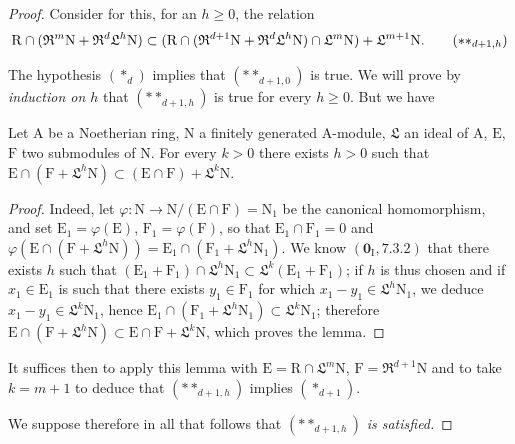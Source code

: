 \begin{proof}
Consider for this, for an $h\geqslant 0$, the relation
\begin{equation}
  \mathrm{R}\cap(\mathfrak{R}^m\mathrm{N}+\mathfrak{R}^d\mathfrak{L}^h\mathrm{N})\subset(\mathrm{R}\cap(\mathfrak{R}^{d+1}\mathrm{N}+\mathfrak{R}^d\mathfrak{L}^h\mathrm{N})\cap\mathfrak{L}^m\mathrm{N})+\mathfrak{L}^{m+1}\mathrm{N}.
  \tag{$**_{d+1,h}$}
\end{equation}

The hypothesis $(*_d)$ implies that $(**_{d+1,0})$ is true. We will prove by \emph{induction on $h$} that $(**_{d+1,h})$ is true for every $h\geqslant 0$. But we have

\begin{lemma}[19.7.1.7]
\label{IV.19.7.1.7}
Let $\mathrm{A}$ be a Noetherian ring, $\mathrm{N}$ a finitely generated $\mathrm{A}$-module, $\mathfrak{L}$ an ideal of $\mathrm{A}$, $\mathrm{E}$, $\mathrm{F}$ two submodules of $\mathrm{N}$. For every $k>0$ there exists $h>0$ such that $\mathrm{E}\cap(\mathrm{F}+\mathfrak{L}^h\mathrm{N})\subset(\mathrm{E}\cap\mathrm{F})+\mathfrak{L}^k\mathrm{N}$.
\end{lemma}

\begin{proof}
Indeed, let $\varphi:\mathrm{N}\to\mathrm{N}/(\mathrm{E}\cap\mathrm{F})=\mathrm{N}_1$ be the canonical homomorphism, and set $\mathrm{E}_1=\varphi(\mathrm{E})$, $\mathrm{F}_1=\varphi(\mathrm{F})$, so that $\mathrm{E}_1\cap\mathrm{F}_1=0$ and $\varphi(\mathrm{E}\cap(\mathrm{F}+\mathfrak{L}^h\mathrm{N}))=\mathrm{E}_1\cap(\mathrm{F}_1+\mathfrak{L}^h\mathrm{N}_1)$.
We know $(\mathbf{0}_\mathrm{I},7.3.2)$ that there exists $h$ such that $(\mathrm{E}_1+\mathrm{F}_1)\cap\mathfrak{L}^h\mathrm{N}_1\subset\mathfrak{L}^k(\mathrm{E}_1+\mathrm{F}_1)$; if $h$ is thus chosen and if $x_1\in\mathrm{E}_1$ is such that there exists $y_1\in\mathrm{F}_1$ for which $x_1-y_1\in\mathfrak{L}^h\mathrm{N}_1$, we deduce $x_1-y_1\in\mathfrak{L}^k\mathrm{N}_1$, hence $\mathrm{E}_1\cap(\mathrm{F}_1+\mathfrak{L}^h\mathrm{N}_1)\subset\mathfrak{L}^k\mathrm{N}_1$; therefore $\mathrm{E}\cap(\mathrm{F}+\mathfrak{L}^h\mathrm{N})\subset\mathrm{E}\cap\mathrm{F}+\mathfrak{L}^k\mathrm{N}$, which proves the lemma.
\end{proof}

It suffices then to apply this lemma with $\mathrm{E}=\mathrm{R}\cap\mathfrak{L}^m\mathrm{N}$, $\mathrm{F}=\mathfrak{R}^{d+1}\mathrm{N}$ and to take $k=m+1$ to deduce that $(**_{d+1,h})$ implies $(*_{d+1})$.

We suppose therefore in all that follows that $(**_{d+1,h})$ \emph{is satisfied.}


\end{proof}
